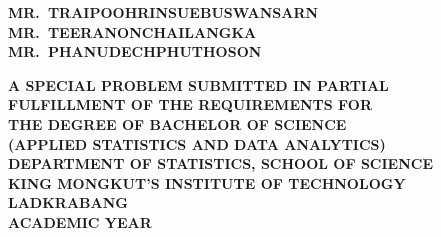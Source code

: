 \thispagestyle{empty}
\begin{center}
  \vspace*{0.5in}

  \begin{minipage}{0.95\textwidth}\centering\sloppy
    {\fontsize{22pt}{30pt}\selectfont\bfseries\MakeUppercase{\thesistitleEN}\par}
  \end{minipage}

  \vfill

  {\fontsize{20pt}{30pt}\selectfont\bfseries
    \MakeUppercase{Mr.\ Traipoohrin}\hspace{1.5em}\MakeUppercase{Suebuswansarn}\\[2pt]
    \MakeUppercase{Mr.\ Teeranon}\hspace{1.5em}\MakeUppercase{Chailangka}\\[2pt]
    \MakeUppercase{Mr.\ Phanudech}\hspace{1.5em}\MakeUppercase{Phuthoson}\par
  }

  \vfill

  \begin{minipage}{0.92\textwidth}\centering
    {\fontsize{20pt}{30pt}\selectfont\bfseries
      A SPECIAL PROBLEM SUBMITTED IN PARTIAL\\
      FULFILLMENT OF THE REQUIREMENTS FOR\\
      THE DEGREE OF BACHELOR OF SCIENCE\\
      (APPLIED STATISTICS AND DATA ANALYTICS)\\
      DEPARTMENT OF STATISTICS, SCHOOL OF SCIENCE\\
      KING MONGKUT'S INSTITUTE OF TECHNOLOGY LADKRABANG\\
      ACADEMIC YEAR\ \academicyearEN\par
    }
  \end{minipage}

  \vspace*{0.5in}
\end{center}
\newpage
